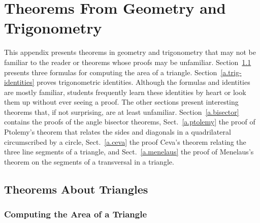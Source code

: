 
\chapter{Theorems From Geometry and Trigonometry}\label{a.trig}




This appendix presents theorems in geometry and trigonometry that may not be familiar to the reader or theorems whose proofs may be unfamiliar. Section~\ref{a.triangles} presents three formulas for computing the area of a triangle. Section~\ref{a.trig-identities} proves trigonometric identities. Although the formulas and identities are mostly familiar, students frequently learn these identities by heart or look them up without ever seeing a proof. The other sections present interesting theorems that, if not surprising, are at least unfamiliar. Section~\ref{a.bisector} contains the proofs of the angle bisector theorems, Sect.~\ref{a.ptolemy} the proof of Ptolemy's theorem that relates the sides and diagonals in a quadrilateral circumscribed by a circle, Sect.~\ref{a.ceva} the proof Ceva's theorem relating the three line segments of a triangle, and Sect.~\ref{a.menelaus} the proof of Menelaus's theorem on the segments of a transversal in a triangle.


\section{Theorems About Triangles}\label{a.triangles}


\subsection{Computing the Area of a Triangle}

